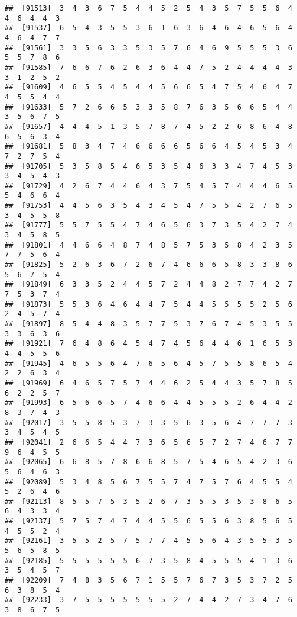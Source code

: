 \documentclass[
]{book}
\begin{document}
\begin{verbatim}
##  [91513]  3  4  3  6  7  5  4  4  5  2  5  4  3  5  7  5  5  6  4  4  6  4  4  3
##  [91537]  6  5  4  3  5  5  3  6  1  6  3  6  4  6  4  6  5  6  4  4  6  4  7  7
##  [91561]  3  3  5  6  3  3  5  3  5  7  6  4  6  9  5  5  5  3  6  5  5  7  8  6
##  [91585]  7  6  6  7  6  2  6  3  6  4  4  7  5  2  4  4  4  4  3  3  1  2  5  2
##  [91609]  4  6  5  5  4  5  4  4  5  6  6  5  4  7  5  4  6  4  7  4  5  5  4  4
##  [91633]  5  7  2  6  6  5  3  3  5  8  7  6  3  5  6  6  5  4  4  3  5  6  7  5
##  [91657]  4  4  4  5  1  3  5  7  8  7  4  5  2  2  6  8  6  4  8  6  5  6  3  4
##  [91681]  5  8  3  4  7  4  6  6  6  6  5  6  6  4  5  4  5  3  4  7  2  7  5  4
##  [91705]  5  3  5  8  5  4  6  5  3  5  4  6  3  3  4  7  4  5  3  3  4  5  4  3
##  [91729]  4  2  6  7  4  4  6  4  3  7  5  4  5  7  4  4  4  6  5  5  4  6  6  4
##  [91753]  4  4  5  6  3  5  4  3  4  5  4  7  5  5  4  2  7  6  5  3  4  5  5  8
##  [91777]  5  5  7  5  5  4  7  4  6  5  6  3  7  3  5  4  2  7  4  3  4  5  8  5
##  [91801]  4  4  6  6  4  8  7  4  8  5  7  5  3  5  8  4  2  3  5  7  7  5  6  4
##  [91825]  5  2  6  3  6  7  2  6  7  4  6  6  6  5  8  3  3  8  6  5  6  7  5  4
##  [91849]  6  3  3  5  2  4  4  5  7  2  4  4  8  2  7  7  4  2  7  7  5  3  7  4
##  [91873]  5  5  3  6  4  6  4  4  7  5  4  4  5  5  5  5  2  5  6  2  4  5  7  4
##  [91897]  8  5  4  4  8  3  5  7  7  5  3  7  6  7  4  5  3  5  5  3  3  6  3  6
##  [91921]  7  6  4  8  6  4  5  4  7  4  5  6  4  4  6  1  6  5  3  4  4  5  5  6
##  [91945]  4  6  5  5  6  4  7  6  5  6  4  5  7  5  5  8  6  5  4  2  2  6  3  4
##  [91969]  6  4  6  5  7  5  7  4  4  6  2  5  4  4  3  5  7  8  5  6  2  2  5  7
##  [91993]  6  5  6  6  5  7  4  6  6  4  4  5  5  5  2  6  4  4  2  8  3  7  4  3
##  [92017]  3  5  5  8  5  3  7  3  3  5  6  3  5  6  4  7  7  7  3  3  4  5  4  5
##  [92041]  2  6  6  5  4  4  7  3  6  5  6  5  7  2  7  4  6  7  7  9  6  4  5  5
##  [92065]  6  6  8  5  7  8  6  6  8  5  7  5  4  6  5  4  2  3  6  5  6  4  6  3
##  [92089]  5  3  4  8  5  6  7  5  5  7  4  7  5  7  6  4  5  5  4  5  2  6  4  6
##  [92113]  8  5  5  7  5  3  5  2  6  7  3  5  5  3  5  3  8  6  5  6  4  3  3  4
##  [92137]  5  7  5  7  4  7  4  4  5  5  6  5  5  6  3  8  5  6  5  4  5  5  2  4
##  [92161]  3  5  5  2  5  7  5  7  7  4  5  5  6  4  3  5  5  3  5  5  6  5  8  5
##  [92185]  5  5  5  5  5  5  6  7  3  5  8  4  5  5  5  4  1  3  6  3  5  4  5  7
##  [92209]  7  4  8  3  5  6  7  1  5  5  7  6  7  3  5  3  7  2  5  6  3  8  5  4
##  [92233]  3  7  5  5  5  5  5  5  5  2  7  4  4  2  7  3  4  7  6  3  8  6  7  5

\end{verbatim}
\end{document}
